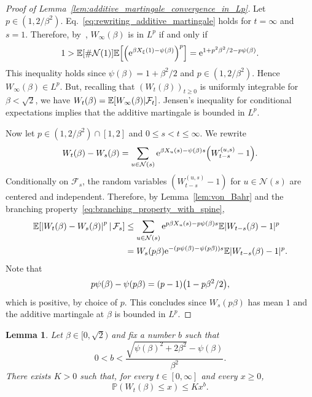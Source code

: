 \documentclass[10pt]{amsart}
\newtheorem{lemm}[theo]{Lemma}\newtheorem{prop}[theo]{Proposition}\newtheorem{coro}[theo]{Corollary}\newtheorem{conj}[theo]{Conjecture}
\theoremstyle{definition}\newtheorem{defi}[theo]{Definition}\newtheorem{rema}[theo]{Remark}\newtheorem{exam}[theo]{Example}\newtheorem{exem}[theo]{Example}\newtheorem{nota}[theo]{Notation}
\newcommand{\e}{\mathrm{e}}
\newcommand{\E}{\mathbb{E}}
\renewcommand{\P}{\mathbb{P}}
\newcommand\1{\mathds{1}}
\newcommand{\cF}{\mathcal{F}}
\newcommand{\cN}{\mathcal{N}}
\let\originalleft\left
\let\originalright\right
\renewcommand{\left}{\mathopen{}\mathclose\bgroup\originalleft}
\renewcommand{\right}{\aftergroup\egroup\originalright}
\begin{document}
\begin{proof}[Proof of Lemma~\ref{lem:additive_martingale_convergence_in_Lp}]
Let $p \in (1, 2/\beta^2)$. Eq.~\eqref{eq:rewriting_additive_martingale} holds for $t = \infty$ and $s = 1$. Therefore, by~\cite[Proposition~4.11]{Liu2002}, $W_\infty(\beta)$ is in $L^p$ if and only if
\begin{equation*}
1 > \E \left[\# \cN(1) \right] \E \left[\left(\e^{\beta X_\xi(1) - \psi(\beta)} \right)^p \right] = \e^{1 + p^2 \beta^2/2 - p\psi(\beta)}.
\end{equation*}
This inequality holds since $\psi(\beta) = 1 + \beta^2/2$ and $p \in (1, 2/\beta^2)$. Hence ${W_\infty(\beta) \in L^p}$. But, recalling that $(W_t(\beta))_{t\geq 0}$ is uniformly integrable for $\beta < \sqrt{2}$, we have $W_t(\beta) = \E \left[W_\infty(\beta) \middle| \cF_t \right]$. Jensen's inequality for conditional expectations implies that the additive martingale is bounded in $L^p$.

Now let $p \in (1, 2/\beta^2) \cap [1, 2]$ and $0 \leq s < t \leq \infty$. We rewrite
\begin{equation*}
W_t(\beta) - W_s(\beta) = \sum_{u \in \cN(s)} \e^{\beta X_u(s) - \psi(\beta)s} \left(W_{t - s}^{(u, s)} - 1\right).
\end{equation*}
Conditionally on $\cF_s$, the random variables $(W_{t - s}^{(u, s)} - 1)$ for $u \in \cN(s)$ are centered and independent. Therefore, by Lemma~\ref{lem:von_Bahr} and the branching property~\eqref{eq:branching_property_with_spine},
\begin{equation}
\begin{aligned}[t]
\E \left[\left|W_t(\beta) - W_s(\beta)\right|^p \,\middle|\, \cF_s \right]  
&\leq \sum_{u \in \cN(s)} \e^{p \beta X_u(s) - p \psi(\beta)s} \E|W_{t-s}(\beta) - 1|^p \\
&= W_s(p\beta) \e^{-(p\psi(\beta) - \psi(p\beta))s} \E|W_{t-s}(\beta) - 1|^p. 
\end{aligned}
\end{equation}
Note that
\begin{equation}\label{eq:pc-cp}
p\psi(\beta) - \psi(p\beta) = (p - 1)\left(1 - p\beta^2/2\right),
\end{equation}
which is positive, by choice of $p$. This concludes since $W_s(p\beta)$ has mean $1$ and the additive martingale at $\beta$ is bounded in $L^p$.
\end{proof}

\begin{lemm}\label{lem:left_tail_additive_martingale}
Let $\beta \in [0, \sqrt{2})$ and fix a number $b$ such that
\begin{equation}\label{eq:b_values}
0 < b < \frac{\sqrt{\psi(\beta)^2 + 2\beta^2} - \psi(\beta)}{\beta^2}.
\end{equation}
There exists $K > 0$ such that, for every $t \in [0, \infty]$ and every $x \geq 0$,
\begin{equation}\label{eq:left_tail_additive_martingale}
\P(W_t(\beta) \leq x) \leq K x^b.
\end{equation}
\end{lemm}
\end{document}
